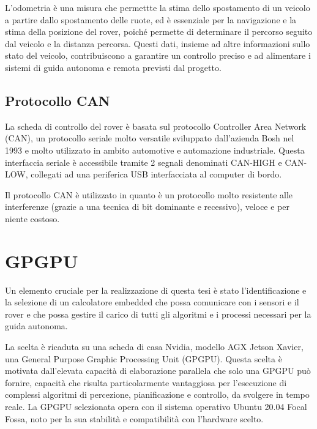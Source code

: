 \noindent L'odometria è una misura che permettte la stima dello spostamento di un veicolo a partire dallo spostamento delle ruote, ed è essenziale per la navigazione e la stima della posizione del rover, poiché permette di determinare il percorso seguito dal veicolo e la distanza percorsa. Questi dati, insieme ad altre informazioni sullo stato del veicolo, contribuiscono a garantire un controllo preciso e ad alimentare i sistemi di guida autonoma e remota previsti dal progetto.

\subsection{Protocollo CAN}
La scheda di controllo del rover è basata sul protocollo Controller Area Network (CAN), un protocollo seriale molto versatile sviluppato dall'azienda Bosh nel 1993 e molto utilizzato in ambito automotive e automazione industriale. Questa interfaccia seriale è accessibile tramite 2 segnali denominati CAN-HIGH e CAN-LOW, collegati ad una periferica USB interfacciata al computer di bordo.

\noindent Il protocollo CAN è utilizzato in quanto è un protocollo molto resistente alle interferenze (grazie a una tecnica di bit dominante e recessivo), veloce e per niente costoso.  

\section{GPGPU}
Un elemento cruciale per la realizzazione di questa tesi è stato l'identificazione e la selezione di un calcolatore embedded che possa comunicare con i sensori e il rover e che possa gestire il carico di tutti gli algoritmi e i processi necessari per la guida autonoma.

\noindent La scelta è ricaduta su una scheda di casa Nvidia, modello AGX Jetson Xavier, una  General Purpose Graphic Processing Unit (GPGPU). Questa scelta è motivata dall'elevata capacità di elaborazione parallela che solo una GPGPU può fornire, capacità che risulta particolarmente vantaggiosa per l'esecuzione di complessi algoritmi di percezione, pianificazione e controllo, da svolgere in tempo reale. La GPGPU selezionata opera con il sistema operativo Ubuntu 20.04 Focal Fossa, noto per la sua stabilità e compatibilità con l'hardware scelto.

